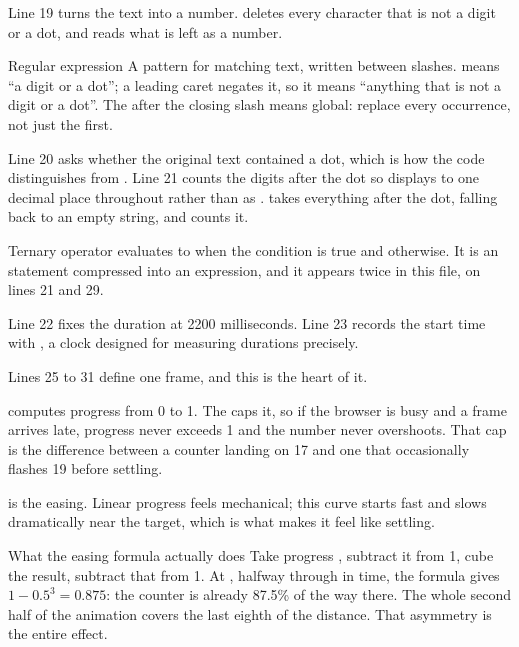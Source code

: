Line 19 turns the text into a number.  deletes
every character that is not a digit or a dot, and  reads what is
left as a number.

\begin{jargon}{Regular expression}
A pattern for matching text, written between slashes. \code{[0-9.]} means ``a digit
or a dot''; a leading caret negates it, so it means ``anything that is not a digit
or a dot''. The  after the closing slash means global: replace every
occurrence, not just the first.
\end{jargon}

Line 20 asks whether the original text contained a dot, which is how the code
distinguishes  from . Line 21 counts the digits after the dot so
 displays to one decimal place throughout rather than as
.  takes everything after the dot,
falling back to an empty string, and  counts it.

\begin{jargon}{Ternary operator}
 evaluates to  when the condition is true and
 otherwise. It is an  statement compressed into an expression, and
it appears twice in this file, on lines 21 and 29.
\end{jargon}

Line 22 fixes the duration at 2200 milliseconds. Line 23 records the start time with
, a clock designed for measuring durations precisely.

Lines 25 to 31 define one frame, and this is the heart of it.

 computes progress from 0 to 1. The
 caps it, so if the browser is busy and a frame arrives late,
progress never exceeds 1 and the number never overshoots. That cap is the difference
between a counter landing on 17 and one that occasionally flashes 19 before
settling.

 is the easing. Linear progress feels
mechanical; this curve starts fast and slows dramatically near the target, which is
what makes it feel like settling.

\begin{keyidea}{What the easing formula actually does}
Take progress , subtract it from 1, cube the result, subtract that from 1.
At , halfway through in time, the formula gives $1 - 0.5^3 = 0.875$:
the counter is already 87.5\% of the way there. The whole second half of the
animation covers the last eighth of the distance. That asymmetry is the entire
effect.
\end{keyidea}

